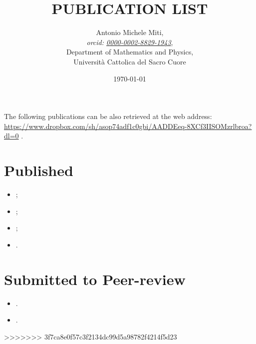 \documentclass{article}
\title{PUBLICATION LIST}
\date{\today}
\author{
	Antonio Michele Miti,\\
	\emph{orcid: \href{https://orcid.org/0000-0002-8829-1943}{0000-0002-8829-1943}},
	\\
	Department of Mathematics and Physics,\\
	Università Cattolica del Sacro Cuore
}
\begin{document}
  

	\maketitle

	\noindent
  The following publications can be also retrieved at the web address:
  \\ 
  \url{https://www.dropbox.com/sh/asop74adf1c0gbi/AADDEeq-8XCf3IISOMzrlbroa?dl=0}
  .


  \section*{Published}
	  \begin{itemize}
 	   \item {};
 	   \item {};
 	   \item {};
 	   \item {}.
	  \end{itemize}



  \section*{Submitted to Peer-review}
	  \begin{itemize}
    	   \item {}.
 	   \item {}.
	  \end{itemize}

%  
>>>>>>> 3f7ca8e0f57c3f2134dc99d5a98782f4214f5d23

  
\end{document}
